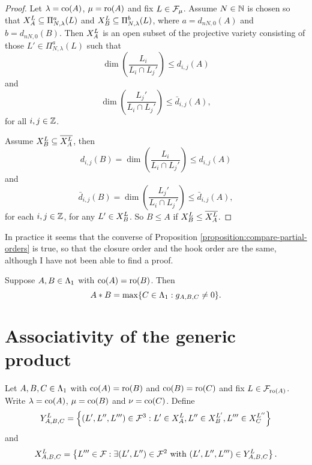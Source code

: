 \documentclass[a4paper, 11pt, twoside]{report}
\begin{document}
\begin{proof}
Let $\lambda=\co{A}$, $\mu=\ro{A}$ and fix $L\in\flags_\mu$. Assume $N\in\naturals$ is chosen so that $\xprod[L]{A}\subset\Pi_{N,\lambda}^a(L)$ and $\xprod[L]{B}\subset\Pi_{N,\lambda}^b(L)$, where $a=d_{nN,0}{(A)}$ and $b=d_{nN,0}{(B)}$. Then $\xprod[L]{A}$ is an open subset of the projective variety consisting of those $L'\in\Pi_{N,\lambda}^a(L)$ such that
\begin{equation*}
\dim\left(\frac{L_i}{L_i\cap L_j'}\right)\le d_{i,j}{(A)}
\end{equation*}
and
\begin{equation*}
\dim\left(\frac{L_j'}{L_i\cap L_j'}\right)\le\bar{d}_{i,j}{(A)},
\end{equation*}
for all $i,j\in\integers$.

Assume $\xprod[L]{B}\subset \overline{\xprod[L]{A}}$, then
\begin{equation*}
d_{i,j}{(B)} = \dim\left(\frac{L_i}{L_i\cap L_j'}\right) \le d_{i,j}{(A)}
\end{equation*}
and
\begin{equation*}
\bar{d}_{i,j}{(B)} = \dim\left(\frac{L_j'}{L_i\cap L_j'}\right) \le \bar{d}_{i,j}{(A)},
\end{equation*}
for each $i,j\in\integers$, for any $L'\in\xprod[L]{B}$. So $B\le A$ if $\xprod[L]{B}\le\overline{\xprod[L]{A}}$.
\end{proof}

\begin{remark}
In practice it seems that the converse of Proposition \ref{proposition:compare-partial-orders} is true, so that the closure order and the hook order are the same, although I have not been able to find a proof.
\end{remark}

\begin{corollary}
Suppose $A,B\in\matrices$ with $\co{A}=\ro{B}$. Then
\begin{equation*}
A\ast B = \max\{C\in\matrices: g_{A,B,C}\neq 0\}.
\end{equation*}
\end{corollary}


\section{Associativity of the generic product}

Let $A,B,C\in\matrices$ with $\co{A}=\ro{B}$ and $\co{B}=\ro{C}$ and fix $L\in\flags_{\ro{A}}$. Write $\lambda=\co{A}$, $\mu=\co{B}$ and $\nu=\co{C}$. Define
\begin{equation*}
\yprod[L]{A,B,C} = \left\{(L',L'',L''')\in\flags^3: L'\in\xprod[L]{A}, L''\in\xprod[L']{B}, L'''\in\xprod[L'']{C}\right\}
\end{equation*}
and
\begin{equation*}
\xprod[L]{A,B,C} = \left\{L'''\in\flags: \exists (L',L'')\in\flags^2 \text{ with } (L',L'',L''')\in\yprod[L]{A,B,C}\right\}.
\end{equation*}
\end{document}
